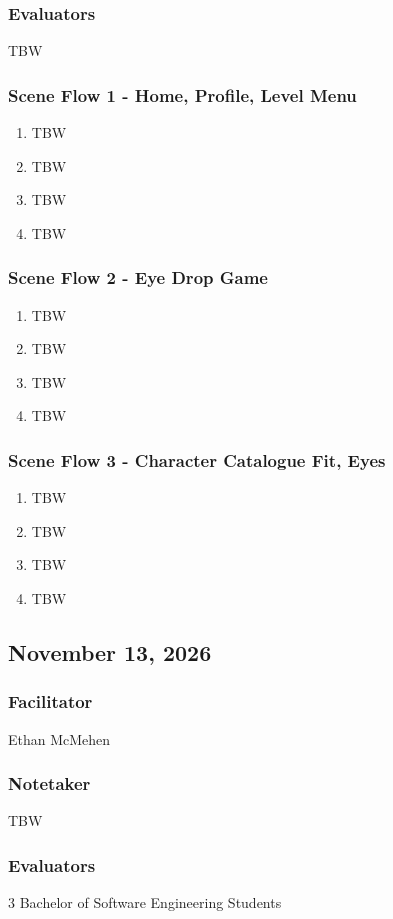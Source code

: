 \documentclass{article}
\begin{document}
\subsubsection*{Evaluators}
TBW
\subsubsection{Scene Flow 1 - Home, Profile, Level Menu}
\begin{enumerate}
    \item TBW
    \item TBW
    \item TBW
    \item TBW
\end{enumerate}
\subsubsection{Scene Flow 2 - Eye Drop Game}
\begin{enumerate}
    \item TBW
    \item TBW
    \item TBW
    \item TBW
\end{enumerate}
\subsubsection{Scene Flow 3 - Character Catalogue Fit, Eyes}
\begin{enumerate}
    \item TBW
    \item TBW
    \item TBW
    \item TBW
\end{enumerate}

\newpage

\subsection{November 13, 2026}
\subsubsection*{Facilitator}
Ethan McMehen
\subsubsection*{Notetaker}
TBW
\subsubsection*{Evaluators}
3 Bachelor of Software Engineering Students
\end{document}
